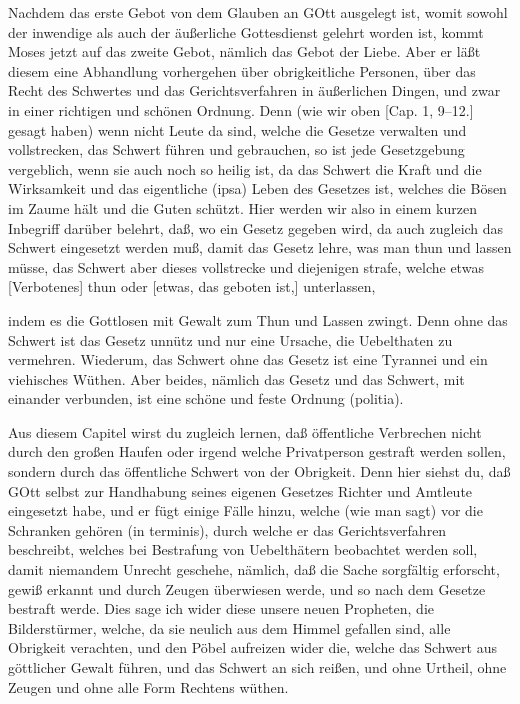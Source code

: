 Nachdem das erste Gebot von dem Glauben an GOtt ausgelegt ist, womit sowohl der inwendige als auch der äußerliche Gottesdienst gelehrt worden ist, kommt Moses jetzt auf das zweite Gebot, nämlich das Gebot der Liebe. Aber er läßt diesem eine Abhandlung vorhergehen über obrigkeitliche Personen, über das Recht des Schwertes und das Gerichtsverfahren in äußerlichen Dingen, und zwar in einer richtigen und schönen Ordnung. Denn (wie wir oben [Cap. 1, 9–12.] gesagt haben) wenn nicht Leute da sind, welche die Gesetze verwalten und vollstrecken, das Schwert führen und gebrauchen, so ist jede Gesetzgebung vergeblich, wenn sie auch noch so heilig ist, da das Schwert die Kraft und die Wirksamkeit und das eigentliche (ipsa) Leben des Gesetzes ist, welches die Bösen im Zaume hält und die Guten schützt. Hier werden wir also in einem kurzen Inbegriff darüber belehrt, daß, wo ein Gesetz gegeben wird, da auch zugleich das Schwert eingesetzt werden muß, damit das Gesetz lehre, was man thun und lassen müsse, das Schwert aber dieses vollstrecke und diejenigen strafe, welche etwas [Verbotenes] thun oder [etwas, das geboten ist,] unterlassen,

indem es die Gottlosen mit Gewalt zum Thun und Lassen zwingt. Denn ohne das Schwert ist das Gesetz unnütz und nur eine Ursache, die Uebelthaten zu vermehren. Wiederum, das Schwert ohne das Gesetz ist eine Tyrannei und ein viehisches Wüthen. Aber beides, nämlich das Gesetz und das Schwert, mit einander verbunden, ist eine schöne und feste Ordnung (politia).

Aus diesem Capitel wirst du zugleich lernen, daß öffentliche Verbrechen nicht durch den großen Haufen oder irgend welche Privatperson gestraft werden sollen, sondern durch das öffentliche Schwert von der Obrigkeit. Denn hier siehst du, daß GOtt selbst zur Handhabung seines eigenen Gesetzes Richter und Amtleute eingesetzt habe, und er fügt einige Fälle hinzu, welche (wie man sagt) vor die Schranken gehören (in terminis), durch welche er das Gerichtsverfahren beschreibt, welches bei Bestrafung von Uebelthätern beobachtet werden soll, damit niemandem Unrecht geschehe, nämlich, daß die Sache sorgfältig erforscht, gewiß erkannt und durch Zeugen überwiesen werde, und so nach dem Gesetze bestraft werde. Dies sage ich wider diese unsere neuen Propheten, die Bilderstürmer, welche, da sie neulich aus dem Himmel gefallen
sind, alle Obrigkeit verachten, und den Pöbel aufreizen wider die, welche das Schwert aus göttlicher Gewalt führen, und das Schwert an sich reißen, und ohne Urtheil, ohne Zeugen und ohne alle Form Rechtens wüthen.

